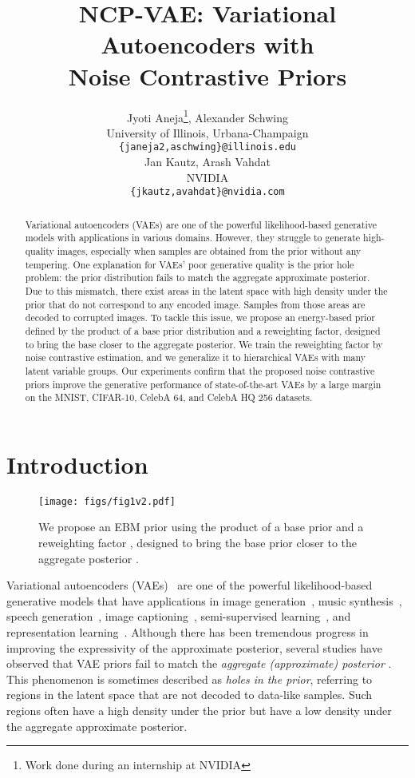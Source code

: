 \documentclass{article} \usepackage{iclr2021_conference,times}
\title{NCP-VAE: Variational Autoencoders with \\ Noise Contrastive Priors}
\author{Jyoti Aneja\thanks{Work done during an internship at NVIDIA},  Alexander Schwing \\
University of Illinois, Urbana-Champaign\\
\texttt{\{janeja2,aschwing\}@illinois.edu} \\
\And
Jan Kautz, Arash Vahdat \\
NVIDIA \\
\texttt{\{jkautz,avahdat\}@nvidia.com} \\
}
\begin{document}
\maketitle

\begin{abstract}
Variational autoencoders (VAEs) are one of the powerful likelihood-based generative models with applications in various domains. However, they struggle to generate high-quality images, especially when samples are obtained from the prior without any tempering. One explanation for VAEs' poor generative quality is the prior hole problem: the prior distribution fails to match the aggregate approximate posterior. Due to this mismatch, there exist areas in the latent space with high density under the prior that do not correspond to any encoded image. Samples from those areas are decoded to corrupted images. To tackle this issue, we propose an energy-based prior defined by the product of a base prior distribution and a reweighting factor, designed to bring the base closer to the aggregate posterior. We train the reweighting factor by noise contrastive estimation, and we generalize it to hierarchical VAEs with many latent variable groups. Our experiments confirm that the proposed noise contrastive priors improve the generative performance of state-of-the-art VAEs by a large margin on the MNIST, CIFAR-10, CelebA 64, and CelebA HQ 256 datasets.
\end{abstract} \section{Introduction}


\begin{wrapfigure}{r}{0.25\textwidth}
\centering
\vspace{-1.0cm}
\texttt{[image: figs/fig1v2.pdf]}
\caption{We propose an EBM prior using the product of a base prior  and a reweighting factor , designed to bring the base prior closer to the aggregate posterior .}
\vspace{-0.2cm}
\label{fig:teaser}
\end{wrapfigure}
Variational autoencoders (VAEs)~\citep{kingma2014vae, rezende2014stochastic} are one of the powerful likelihood-based generative models that have applications in image generation~\citep{brock2018large, karras2019style, razavi2019generating}, music synthesis~\citep{dhariwal2020jukebox}, speech generation~\citep{oord2016wavenet, ping2019waveflow}, image captioning~\citep{aneja2019sequential,deshpande2019fast,aneja2018convolutional}, semi-supervised learning~\citep{kingma2014semi, izmailov2019semi}, and representation learning~\citep{van2017vqvae, fortuin2018som}. Although there has been tremendous progress in improving the expressivity of the approximate posterior, several studies have observed that VAE priors fail to match the \textit{aggregate (approximate) posterior} \citep{rosca2018dmatching, hoffman2016elbo_surgery}. This phenomenon is sometimes described as \textit{holes in the prior}, referring to regions in the latent space that are not decoded to data-like samples. Such regions often have a high density under the prior but have a low density under the aggregate approximate posterior. 
\end{document}
